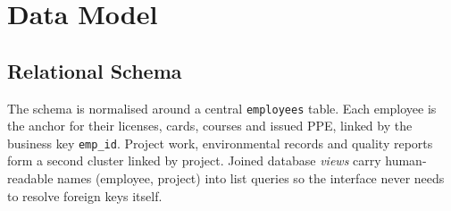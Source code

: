\documentclass[11pt]{article}
\begin{document}
\section{Data Model}
\subsection{Relational Schema}
The schema is normalised around a central \texttt{employees} table. Each employee is the anchor for
their licenses, cards, courses and issued PPE, linked by the business key \texttt{emp\_id}. Project
work, environmental records and quality reports form a second cluster linked by project. Joined
database \emph{views} carry human-readable names (employee, project) into list queries so the
interface never needs to resolve foreign keys itself.
\end{document}
